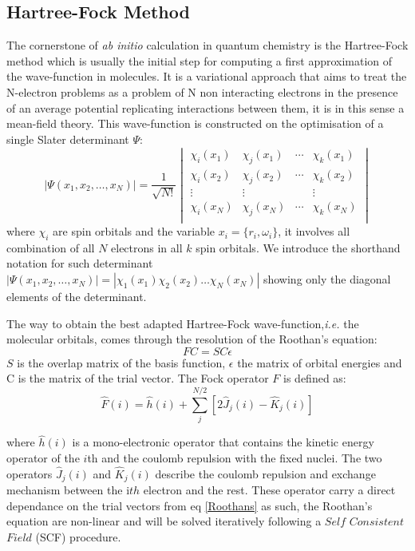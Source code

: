 \documentclass[12pt]{report}
\numberwithin{equation}{section}
\begin{document}
\subsection{Hartree-Fock Method}
The cornerstone of \textit{ab initio} calculation in quantum chemistry is the Hartree-Fock method which is usually the initial step for computing a first approximation of the wave-function in molecules. 
It is a variational approach that aims to treat the N-electron problems as a problem of N non interacting electrons in the presence of an average potential replicating interactions between them, it is in this sense a mean-field theory.
This wave-function is constructed on the optimisation of a single Slater determinant $\Psi$:
\begin{equation}
    |\Psi(x_1,x_2,\ldots,x_N)|=\frac{1}{\sqrt{N!}}
    \begin{vmatrix}
        \chi_i (x_1) & \chi_j (x_1) & \cdots & \chi_k (x_1)\\
        \chi_i (x_2) & \chi_j (x_2) & \cdots & \chi_k (x_2)\\
        \vdots & \vdots &   &  \vdots\\
        \chi_i (x_N) & \chi_j (x_N) & \cdots & \chi_k (x_N)\\
    \end{vmatrix}
\end{equation}
where $\chi_i$ are spin orbitals and the variable $x_i=\{r_i,\omega_i\}$, it involves all combination of all $N$ electrons in all $k$ spin orbitals. 
We introduce the shorthand notation for such determinant $|\Psi(x_1,x_2,\ldots,x_N)|=|\chi_1(x_1)\chi_2(x_2)\ldots\chi_N(x_N)|$ showing only the diagonal elements of the determinant.

The way to obtain the best adapted Hartree-Fock wave-function,\textit{i.e.} the molecular orbitals, comes through the resolution of the Roothan's equation:
\begin{equation}\label{Roothans}
    FC=SC\epsilon
\end{equation}
$S$ is the overlap matrix of the basis function, $\epsilon$ the matrix of orbital energies and C is the matrix of the trial vector.
The Fock operator $F$ is defined as:
\begin{equation}
    \hat{F}(i)=\hat{h}(i)+\sum_{j}^{N/2}[2\hat{J}_{j}(i)-\hat{K}_{j}(i)]
\end{equation}

where $\hat{h}(i)$ is a mono-electronic operator that contains the kinetic energy operator of the $i$th and the coulomb repulsion with the fixed nuclei.
The two operators $\hat{J}_{j}(i)$ and $\hat{K}_{j}(i)$ describe the coulomb repulsion and exchange mechanism between the i$th$ electron and the rest.
These operator carry a direct dependance on the trial vectors from eq \ref{Roothans} as such, the Roothan's equation are non-linear and will be solved iteratively following a $Self$ $Consistent$ $Field$ (SCF) procedure.
\end{document}
